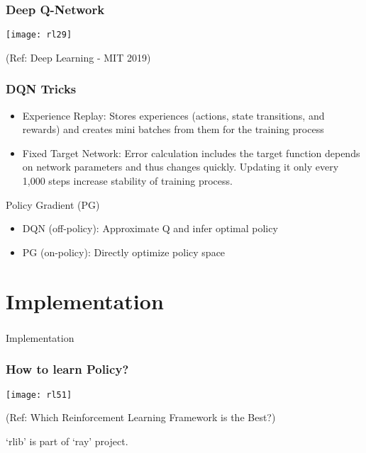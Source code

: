\begin{frame}[fragile]\frametitle{Deep Q-Network}
\begin{center}
\texttt{[image: rl29]}
\end{center}

{\tiny (Ref: Deep Learning - MIT 2019)}


\end{frame}


\begin{frame}[fragile]\frametitle{DQN Tricks}

\begin{itemize}
\item Experience Replay: Stores experiences (actions, state transitions, and rewards) and creates mini batches from them for the training process
\item Fixed Target Network: Error calculation includes the target function depends on network parameters and thus changes quickly. Updating it only every 1,000 steps increase stability of training process.
\end{itemize}

Policy Gradient (PG)
\begin{itemize}
\item DQN (off-policy): Approximate Q and infer optimal policy
\item PG (on-policy): Directly optimize policy space
\end{itemize}

\end{frame}



\section[Example]{Implementation}

\begin{frame}[fragile]\frametitle{}
\begin{center}
{\Large Implementation}
\end{center}
\end{frame}

\begin{frame}[fragile]\frametitle{How to learn Policy?}

\begin{center}
\texttt{[image: rl51]}
\end{center}

{\tiny (Ref: Which Reinforcement Learning Framework is the Best?)}

‘rlib’ is part of `ray’ project.

\end{frame}


